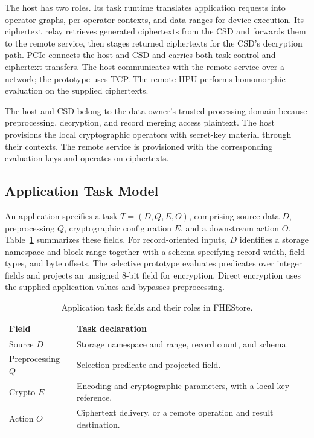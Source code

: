 The host has two roles. Its task runtime translates application requests into operator graphs, per-operator contexts, and data ranges for device execution. Its ciphertext relay retrieves generated ciphertexts from the CSD and forwards them to the remote service, then stages returned ciphertexts for the CSD's decryption path. PCIe connects the host and CSD and carries both task control and ciphertext transfers. The host communicates with the remote service over a network; the prototype uses TCP. The remote HPU performs homomorphic evaluation on the supplied ciphertexts.

The host and CSD belong to the data owner's trusted processing domain because preprocessing, decryption, and record merging access plaintext. The host provisions the local cryptographic operators with secret-key material through their contexts. The remote service is provisioned with the corresponding evaluation keys and operates on ciphertexts.

\subsection{Application Task Model}
\label{subsec:application-task}

An application specifies a task $T=(D,Q,E,O)$, comprising source data $D$, preprocessing $Q$, cryptographic configuration $E$, and a downstream action $O$. Table~\ref{tab:task-contract} summarizes these fields. For record-oriented inputs, $D$ identifies a storage namespace and block range together with a schema specifying record width, field types, and byte offsets. The selective prototype evaluates predicates over integer fields and projects an unsigned 8-bit field for encryption. Direct encryption uses the supplied application values and bypasses preprocessing.

\begin{table}[ht]
  \caption{Application task fields and their roles in FHEStore.}
  \label{tab:task-contract}
  \centering
  \small
  \setlength{\tabcolsep}{3pt}
  \begin{tabular}{@{}p{}p{}@{}}
    \toprule
    Field & Task declaration \\
    \midrule
    Source $D$ & Storage namespace and range, record count, and schema. \\
    Preprocessing $Q$ & Selection predicate and projected field. \\
    Crypto $E$ & Encoding and cryptographic parameters, with a local key reference. \\
    Action $O$ & Ciphertext delivery, or a remote operation and result destination. \\
    \bottomrule
  \end{tabular}
\end{table}

